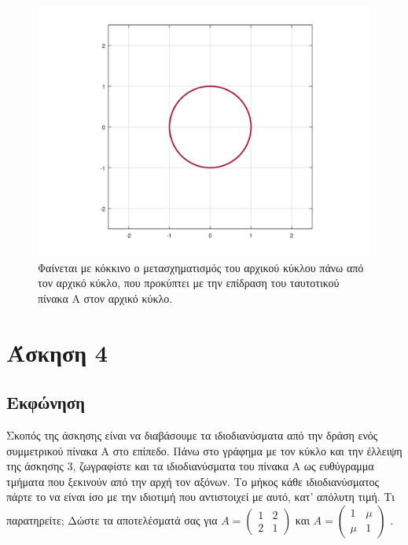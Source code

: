 \documentclass[a4paper,12pt]{article}
\begin{document}
\begin{figure}
    \centering
    \includegraphics[scale=0.6]{i.png}
    \caption{Φαίνεται με κόκκινο ο μετασχηματισμός του αρχικού κύκλου πάνω από τον αρχικό κύκλο,
        που προκύπτει με την επίδραση του ταυτοτικού πίνακα Α στον αρχικό κύκλο.}
\end{figure}
\newpage\section{Άσκηση 4}
\subsection{Εκφώνηση}
Σκοπός της άσκησης είναι να διαβάσουμε τα ιδιοδιανύσματα από την δράση ενός συμμετρικού πίνακα Α στο
επίπεδο. Πάνω στο γράφημα με τον κύκλο και την έλλειψη της άσκησης 3, ζωγραφίστε και τα ιδιοδιανύσματα
του πίνακα Α ως ευθύγραμμα τμήματα που ξεκινούν από την αρχή τον αξόνων. Το μήκος κάθε ιδιοδιανύσματος
πάρτε το να είναι ίσο με την ιδιοτιμή που αντιστοιχεί με αυτό, κατ' απόλυτη τιμή. Τι παρατηρείτε; Δώστε
τα αποτελέσματά σας για
$
    A=\begin{pmatrix}
        1 & 2 \\
        2 & 1
    \end{pmatrix}
$
και
$
    A=\begin{pmatrix}
        1   & \mu \\
        \mu & 1
    \end{pmatrix}
$
.
\end{document}

